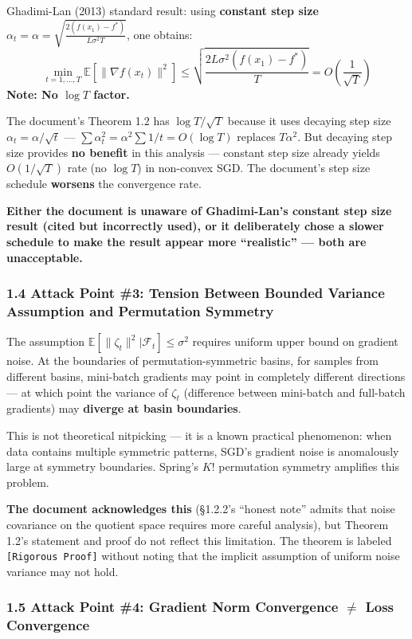 \documentclass[
  12pt,
]{article}
\begin{document}
Ghadimi-Lan (2013) standard result: using \textbf{constant step size} $\alpha_t = \alpha = \sqrt{\frac{2(f(x_1)-f^*)}{L\sigma^2 T}}$, one obtains:
\[\min_{t=1,\ldots,T} \mathbb{E}[\|\nabla f(x_t)\|^2] \leq \sqrt{\frac{2L\sigma^2(f(x_1)-f^*)}{T}} = O\left(\frac{1}{\sqrt{T}}\right)\]
\textbf{Note: No $\log T$ factor.}

The document's Theorem 1.2 has $\log T/\sqrt{T}$ because it uses decaying step size $\alpha_t = \alpha/\sqrt{t}$ --- $\sum \alpha_t^2 = \alpha^2 \sum 1/t = O(\log T)$ replaces $T\alpha^2$. But decaying step size provides \textbf{no benefit} in this analysis --- constant step size already yields $O(1/\sqrt{T})$ rate (no $\log T$) in non-convex SGD. The document's step size schedule \textbf{worsens} the convergence rate.

\textbf{Either the document is unaware of Ghadimi-Lan's constant step size result (cited but incorrectly used), or it deliberately chose a slower schedule to make the result appear more ``realistic'' --- both are unacceptable.}

\subsubsection{1.4 Attack Point \#3: Tension Between Bounded Variance Assumption and Permutation Symmetry}\label{attack-3-bounded-variance}

The assumption $\mathbb{E}[\|\zeta_t\|^2 | \mathcal{F}_t] \leq \sigma^2$ requires uniform upper bound on gradient noise. At the boundaries of permutation-symmetric basins, for samples from different basins, mini-batch gradients may point in completely different directions --- at which point the variance of $\zeta_t$ (difference between mini-batch and full-batch gradients) may \textbf{diverge at basin boundaries}.

This is not theoretical nitpicking --- it is a known practical phenomenon: when data contains multiple symmetric patterns, SGD's gradient noise is anomalously large at symmetry boundaries. Spring's $K!$ permutation symmetry amplifies this problem.

\textbf{The document acknowledges this} (\S1.2.2's ``honest note'' admits that noise covariance on the quotient space requires more careful analysis), but Theorem 1.2's statement and proof do not reflect this limitation. The theorem is labeled \texttt{[Rigorous Proof]} without noting that the implicit assumption of uniform noise variance may not hold.

\subsubsection{1.5 Attack Point \#4: Gradient Norm Convergence $\neq$ Loss Convergence}\label{attack-4-gradient-norm-vs-loss}
\end{document}

